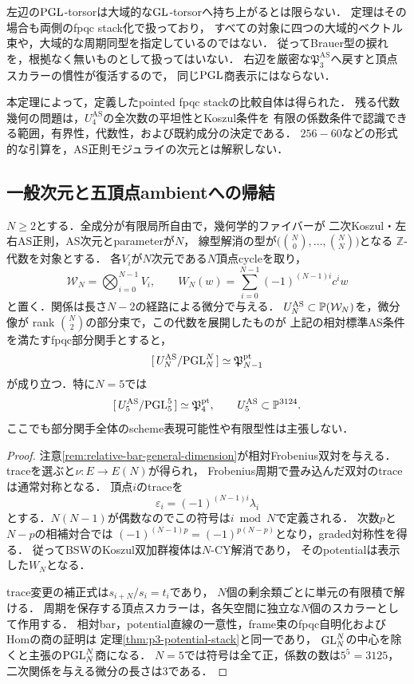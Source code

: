 \begin{remark}[この商表示が含む形式と残る幾何]
左辺の$\mathrm{PGL}$-torsorは大域的な$\mathrm{GL}$-torsorへ持ち上がるとは限らない．
定理はその場合も両側のfpqc stack化で扱っており，
すべての対象に四つの大域的ベクトル束や，大域的な周期同型を指定しているのではない．
従ってBrauer型の捩れを，根拠なく無いものとして扱ってはいない．
右辺を厳密な$\mathfrak P_3^{\mathrm{AS}}$へ戻すと頂点スカラーの慣性が復活するので，
同じ$\mathrm{PGL}$商表示にはならない．

本定理によって，定義したpointed fpqc stackの比較自体は得られた．
残る代数幾何の問題は，$U_4^{\mathrm{AS}}$の全次数の平坦性とKoszul条件を
有限の係数条件で認識できる範囲，有界性，代数性，および既約成分の決定である．
$256-60$などの形式的な引算を，AS正則モジュライの次元とは解釈しない．
\end{remark}

\subsection{一般次元と五頂点ambientへの帰結}

\begin{corollary}[標準$N$次元のpotential商]
\label{cor:standard-n-potential-stack}
$N\ge2$とする．全成分が有限局所自由で，幾何学的ファイバーが
二次Koszul・左右AS正則，AS次元とparameterが$N$，
線型解消の型が$\bigl(\binom N0,\ldots,\binom NN\bigr)$となる
$\mathbb Z$-代数を対象とする．
各$V_i$が$N$次元である$N$頂点cycleを取り，
\[
 \mathcal W_N=\bigotimes_{i=0}^{N-1}V_i,\qquad
 W_N(w)=\sum_{i=0}^{N-1}(-1)^{(N-1)i}c^i w
\]
と置く．関係は長さ$N-2$の経路による微分で与える．
$U_N^{\mathrm{AS}}\subset\mathbb P(\mathcal W_N)$を，微分像が
rank $\binom N2$の部分束で，この代数を展開したものが
上記の相対標準AS条件を満たすfpqc部分関手とすると，
\[
 [\,U_N^{\mathrm{AS}}/\mathrm{PGL}_N^N\,]
 \simeq\mathfrak P_{N-1}^{\mathrm{pt}}
\]
が成り立つ．特に$N=5$では
\begin{equation}\label{eq:p4-five-potential-stack}
 [\,U_5^{\mathrm{AS}}/\mathrm{PGL}_5^5\,]
 \simeq\mathfrak P_4^{\mathrm{pt}},
 \qquad U_5^{\mathrm{AS}}\subset\mathbb P^{3124}.
\end{equation}
ここでも部分関手全体のscheme表現可能性や有限型性は主張しない．
\end{corollary}
\begin{proof}
注意\ref{rem:relative-bar-general-dimension}が相対Frobenius双対を与える．
traceを選ぶと$\nu:E\to E(N)$が得られ，
Frobenius周期で畳み込んだ双対のtraceは通常対称となる．
頂点$i$のtraceを
\[
 \varepsilon_i=(-1)^{(N-1)i}\lambda_i
\]
とする．$N(N-1)$が偶数なのでこの符号は$i\bmod N$で定義される．
次数$p$と$N-p$の相補対合では
$(-1)^{(N-1)p}=(-1)^{p(N-p)}$となり，graded対称性を得る．
従ってBSWのKoszul双加群複体は$N$-CY解消であり，
そのpotentialは表示した$W_N$となる．

trace変更の補正式は$s_{i+N}/s_i=t_i$であり，
$N$個の剰余類ごとに単元の有限積で解ける．
周期を保存する頂点スカラーは，各矢空間に独立な$N$個のスカラーとして作用する．
相対bar，potential直線の一意性，frame束のfpqc自明化およびHomの商の証明は
定理\ref{thm:p3-potential-stack}と同一であり，
$\mathrm{GL}_N^N$の中心を除くと主張の$\mathrm{PGL}_N^N$商になる．
$N=5$では符号は全て正，係数の数は$5^5=3125$，
二次関係を与える微分の長さは3である．
\end{proof}

